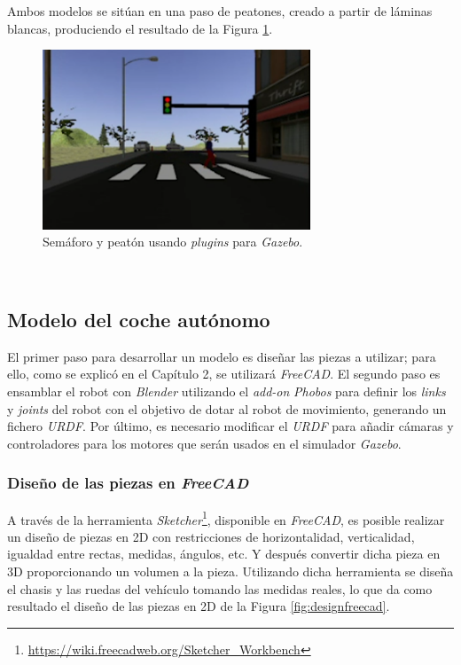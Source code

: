Ambos modelos se sitúan en una paso de peatones, creado a partir de láminas blancas, produciendo el resultado de la Figura \ref{fig:trafficlightpedestrian}.\\

\begin{figure} [h!]
	\begin{center}
		\includegraphics[width=8cm]{figs/trafficlightpedestrian}
	\end{center}
	\caption{Semáforo y peatón usando \textit{plugins} para \textit{Gazebo}.}
	\label{fig:trafficlightpedestrian}
\end{figure}\

\subsection{Modelo del coche autónomo}
\label{subsection:vehiclemodel}
El primer paso para desarrollar un modelo es diseñar las piezas a utilizar; para ello, como se explicó en el Capítulo 2, se utilizará \textit{FreeCAD}. El segundo paso es ensamblar el robot con \textit{Blender} utilizando el \textit{add-on} \textit{Phobos} para definir los \textit{links} y \textit{joints} del robot con el objetivo de dotar al robot de movimiento, generando un fichero \textit{URDF}. Por último, es necesario modificar el \textit{URDF} para añadir cámaras y controladores para los motores que serán usados en el simulador \textit{Gazebo}.\\

\subsubsection{Diseño de las piezas en \textit{FreeCAD}}
A través de la herramienta \textit{Sketcher}\footnote{\url{https://wiki.freecadweb.org/Sketcher_Workbench}}, disponible en \textit{FreeCAD}, es posible realizar un diseño de piezas en 2D con restricciones de horizontalidad, verticalidad, igualdad entre rectas, medidas, ángulos, etc. Y después convertir dicha pieza en 3D proporcionando un volumen a la pieza. Utilizando dicha herramienta se diseña el chasis y las ruedas del vehículo tomando las medidas reales, lo que da como resultado el diseño de las piezas en 2D de la Figura \ref{fig:designfreecad}.\\

